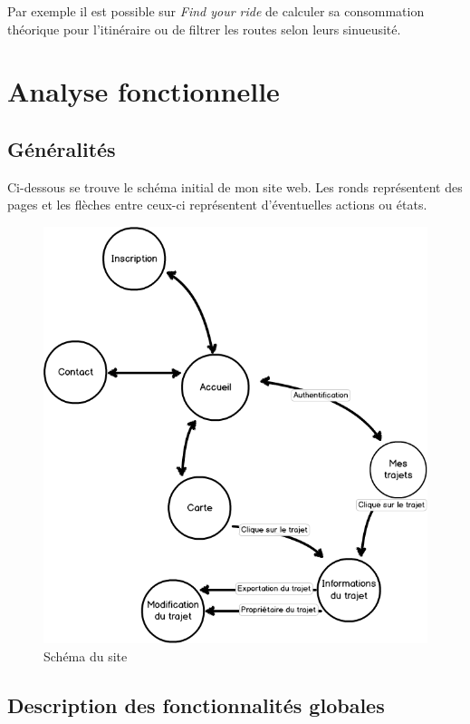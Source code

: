 \documentclass[a4paper]{article}
\newcommand{\fyr}{\emph{Find your ride }}
\begin{document}
Par exemple il est possible sur \fyr de calculer sa consommation théorique pour l'itinéraire ou de filtrer les routes selon leurs sinueusité.



\pagebreak

\section{Analyse fonctionnelle}

\subsection{Généralités}
Ci-dessous se trouve le schéma initial de mon site web. Les ronds représentent des pages et les flèches entre ceux-ci représentent d'éventuelles actions ou états.

\begin{figure}[h]
\centering
\includegraphics[width=\textwidth]{./Images/ShemaSite.png}
\caption{Schéma du site}
\end{figure}

\subsection{Description des fonctionnalités globales}
\end{document}
